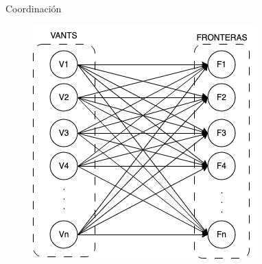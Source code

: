 \documentclass[24pt,aspectratio=169]{beamer}
\begin{document}
\begin{frame}{Coordinación}
\begin{figure}[ht!]
\begin{minipage}{0.48\textwidth}
      \centering
      \includegraphics[width=0.5\linewidth]{asignacion} %
    \end{minipage}
  \end{figure}
\end{frame}
\end{document}
